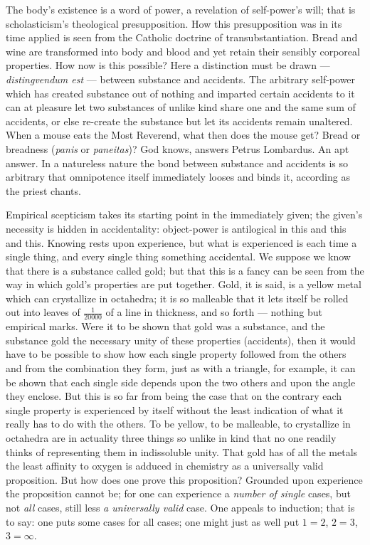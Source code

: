 \documentclass[12pt,a4paper]{book}
\begin{document}
The body's existence is a word of power, a revelation of self-power's will; that is scholasticism's theological
presupposition. How this presupposition was in its time applied is seen from the Catholic doctrine of transubstantiation.
Bread and wine are transformed into body and blood and yet retain their sensibly corporeal properties. How now is this
possible? Here a distinction must be drawn --- \textit{distingvendum est} --- between substance and accidents. The
arbitrary self-power which has created substance out of nothing and imparted certain accidents to it can at pleasure let
two substances of unlike kind share one and the same sum of accidents, or else re-create the substance but let its
accidents remain unaltered. When a mouse eats the Most Reverend, what then does the mouse get? Bread or breadness
(\textit{panis} or \textit{paneitas})? God knows, answers Petrus Lombardus. An apt answer. In a natureless nature the bond
between substance and accidents is so arbitrary that omnipotence itself immediately looses and binds it, according as the
priest chants.

Empirical scepticism takes its starting point in the immediately given; the given's necessity is hidden in accidentality:
object-power is antilogical in this and this and this. Knowing rests upon experience, but what is experienced is each time
a single thing, and every single thing something accidental. We suppose we know that there is a substance called gold;
but that this is a fancy can be seen from the way in which gold's properties are put together. Gold, it is said, is a
yellow metal which can crystallize in octahedra; it is so malleable that it lets itself be rolled out into leaves of
$\frac{1}{20000}$ of a line in thickness, and so forth --- nothing but empirical marks.
Were it to be shown that gold was a substance, and the substance gold the necessary unity of these properties (accidents),
then it would have to be possible to show how each single property followed from the others and from the combination they
form, just as with a triangle, for example, it can be shown that each single side depends upon the two others and upon the
angle they enclose. But this is so far from being the case that on the contrary each single property is experienced by
itself without the least indication of what it really has to do with the others. To be yellow, to be malleable, to
crystallize in octahedra are in actuality three things so unlike in kind that no one readily thinks of representing them
in indissoluble unity. That gold has of all the metals the least affinity to oxygen is adduced in chemistry as a
universally valid proposition. But how does one prove this proposition? Grounded upon experience the proposition cannot be;
for one can experience a \emph{number of single} cases, but not \emph{all} cases, still less \emph{a universally valid}
case. One appeals to induction; that is to say: one puts some cases for all cases; one might just as well put $1 = 2$,
$2 = 3$, $3 = \infty$.
\end{document}
